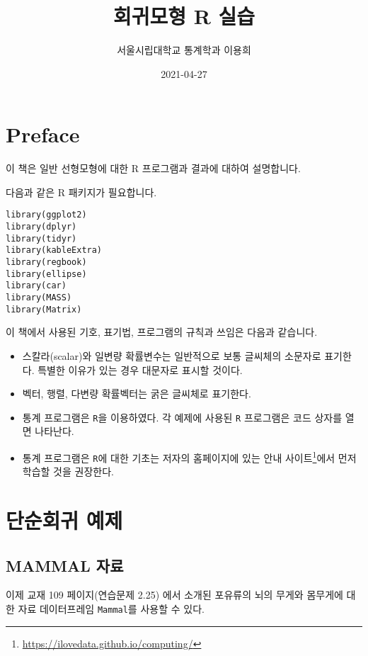 \documentclass[
]{book}
\title{회귀모형 R 실습}
\author{서울시립대학교 통계학과 이용희}
\date{2021-04-27}
\makeatletter
\providecommand{\tightlist}{%
  \setlength{\itemsep}{0pt}\setlength{\parskip}{0pt}}
\renewcommand{\href}[2]{#2\footnote{\url{#1}}}
\newenvironment{kframe}{%
\medskip{}
\setlength{\fboxsep}{.8em}
 \def\at@end@of@kframe{}%
 \ifinner\ifhmode%
  \def\at@end@of@kframe{\end{minipage}}%
  \begin{minipage}{\columnwidth}%
 \fi\fi%
 \def\FrameCommand##1{\hskip\@totalleftmargin \hskip-\fboxsep
 \colorbox{shadecolor}{##1}\hskip-\fboxsep
     \hskip-\linewidth \hskip-\@totalleftmargin \hskip\columnwidth}%
 \MakeFramed {\advance\hsize-\width
   \@totalleftmargin\z@ \linewidth\hsize
   \@setminipage}}%
 {\par\unskip\endMakeFramed%
 \at@end@of@kframe}
\newenvironment{rmdblock}[1]
  {
  \begin{itemize}
  \renewcommand{\labelitemi}{
    \raisebox{-.7\height}[0pt][0pt]{
      {\setkeys{Gin}{width=3em,keepaspectratio}\texttt{[image: images/\#1]}}
    }
  }
  \setlength{\fboxsep}{1em}
  \begin{kframe}
  \item
  }
  {
  \end{kframe}
  \end{itemize}
  }
\newenvironment{rmdimportant}
  {\begin{rmdblock}{important}}
  {\end{rmdblock}}
\makeatother
\begin{document}
\maketitle

{
\setcounter{tocdepth}{1}
\tableofcontents
}
\hypertarget{preface}{%
\chapter*{Preface}\label{preface}}


이 책은 일반 선형모형에 대한 R 프로그램과 결과에 대하여 설명합니다.

다음과 같은 R 패키지가 필요합니다.

\begin{verbatim}
library(ggplot2)
library(dplyr)
library(tidyr)
library(kableExtra)
library(regbook)
library(ellipse)
library(car)
library(MASS)
library(Matrix)
\end{verbatim}

\begin{rmdimportant}
이 책에서 사용된 기호, 표기법, 프로그램의 규칙과 쓰임은 다음과 같습니다.

\begin{itemize}
\tightlist
\item
  스칼라(scalar)와 일변량 확률변수는 일반적으로 보통 글씨체의 소문자로 표기한다. 특별한 이유가 있는 경우 대문자로 표시할 것이다.
\item
  벡터, 행렬, 다변량 확률벡터는 굵은 글씨체로 표기한다.
\item
  통계 프로그램은 \texttt{R}을 이용하였다. 각 예제에 사용된 \texttt{R} 프로그램은 코드 상자를 열면 나타난다.
\item
  통계 프로그램은 \texttt{R}에 대한 기초는 저자의 홈페이지에 있는 \href{https://ilovedata.github.io/computing/}{안내 사이트}에서 먼저 학습할 것을 권장한다.
\end{itemize}
\end{rmdimportant}

\hypertarget{chap02}{%
\chapter{단순회귀 예제}\label{chap02}}

\hypertarget{mammal-uxc790uxb8cc}{%
\section{MAMMAL 자료}\label{mammal-uxc790uxb8cc}}

이제 교재 109 페이지(연습문제 2.25) 에서 소개된 포유류의 뇌의 무게와 몸무게에 대한 자료 데이터프레임 \texttt{Mammal}를 사용할 수 있다.
\end{document}
